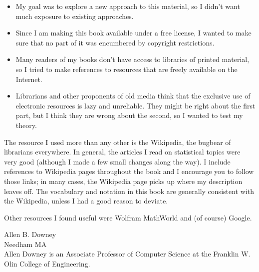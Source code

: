 \documentclass[12pt]{book}
\begin{document}
\begin{itemize}

\item My goal was to explore a new approach to this material, so I didn't
want much exposure to existing approaches.

\item Since I am making this book available under a free license, I wanted
to make sure that no part of it was encumbered by copyright restrictions.

\item Many readers of my books don't have access to libraries of
printed material, so I tried to make references to resources that are
freely available on the Internet.

\item Librarians and other proponents of old media think that the exclusive
use of electronic resources is lazy and unreliable.  They might be right
about the first part, but I think they are wrong about the second, so
I wanted to test my theory.


\end{itemize}

The resource I used more than any other is the Wikipedia, the bugbear
of librarians everywhere.  In general, the articles I read on
statistical topics were very good (although I made a few small changes
along the way).  I include references to Wikipedia pages throughout
the book and I encourage you to follow those links; in many cases, the
Wikipedia page picks up where my description leaves off.  The
vocabulary and notation in this book are generally consistent with the
Wikipedia, unless I had a good reason to deviate.

Other resources I found useful were Wolfram MathWorld and (of course)
Google.

Allen B. Downey \\
Needham MA\\

Allen Downey is an Associate Professor of Computer Science at 
the Franklin W. Olin College of Engineering.




\end{document}
